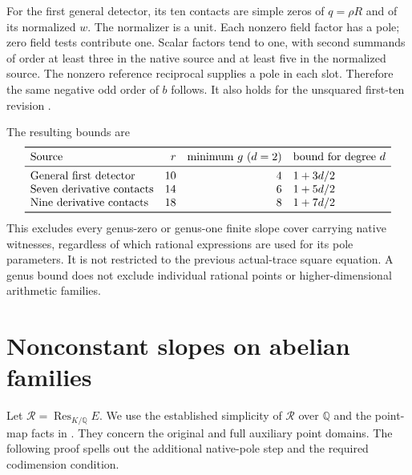 \documentclass[11pt,a4paper]{article}
\newcommand{\Q}{\mathbb Q}\newcommand{\Z}{\mathbb Z}
\begin{document}
For the first general detector, its ten contacts are simple zeros
of $q=\rho R$ and of its normalized $w$. The normalizer is a unit.
Each nonzero field factor has a pole; zero field tests contribute
one. Scalar factors tend to one, with second summands of order at
least three in the native source and at least five in the normalized
source. The nonzero reference reciprocal supplies a pole in each
slot. Therefore the same negative odd order of $b$ follows. It also
holds for the unsquared first-ten revision \cite{Even25}.

The resulting bounds are
\[
\begin{array}{lrrl}
\toprule
\text{Source}&r&\text{minimum }g\ (d=2)&\text{bound for degree }d\\
\midrule
\text{General first detector}&10&4&1+3d/2\\
\text{Seven derivative contacts}&14&6&1+5d/2\\
\text{Nine derivative contacts}&18&8&1+7d/2\\
\bottomrule
\end{array}
\]
This excludes every genus-zero or genus-one finite slope cover
carrying native witnesses, regardless of which rational expressions
are used for its pole parameters. It is not restricted to the
previous actual-trace square equation. A genus bound does not exclude
individual rational points or higher-dimensional arithmetic families.

\section{Nonconstant slopes on abelian families}
Let $\mathcal R=\operatorname{Res}_{K/\Q}E$. We use the established
simplicity of $\mathcal R$ over $\Q$ and the point-map facts in
\cite[Sections 3 and 5]{Abelian}. They concern the original and full
auxiliary point domains. The following proof spells out the additional
native-pole step and the required codimension condition.
\end{document}
